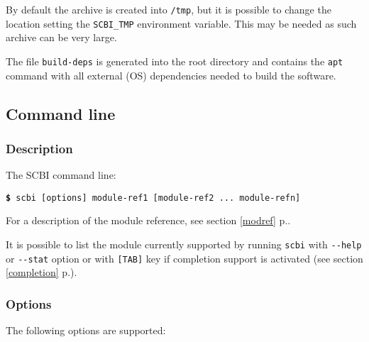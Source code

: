 \documentclass[a4paper,12pt,twoside]{article}
\newcommand{\code}[1]{\texttt{#1}}
\newcommand{\seeref}[1]{see section \ref{#1} p.\pageref{#1}}
\newcommand{\cmd}[1]{\tabto{1cm}\hspace{0.5cm}\texttt{\textbf{\$} #1}}
\newcommand{\ddash}{-{}-}
\begin{document}
By default the archive is created into \code{/tmp}, but it is possible to change the location setting the \code{SCBI\_TMP} environment variable. This may be needed as such archive can be very large.

The file \code{build-deps} is generated into the root directory and contains the \code{apt} command with all external (OS) dependencies needed to build the software.

\subsection{Command line}

\subsubsection{Description}

The SCBI command line:

\cmd{scbi [options] module-ref1 [module-ref2 ... module-refn]}

For a description of the module reference, \seeref{modref}.

It is possible to list the module currently supported by running \code{scbi} with \code{\ddash{}help} or \code{\ddash{}stat} option or with \code{[TAB]} key if completion support is activated (\seeref{completion}).

\subsubsection{Options}
\label{cmdline}

The following options are supported:
\end{document}
